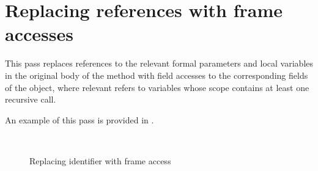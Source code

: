 \section{Replacing references with frame accesses}

This pass replaces references to the relevant formal parameters and local variables in the original body of the method
with field accesses to the corresponding fields of the  object, where relevant refers to variables whose
scope contains at least one recursive call.

An example of this pass is provided in .

\begin{figure}[htb]
    \\
    \caption{Replacing identifier with frame access \label{img:replace-identifier}}
\end{figure}